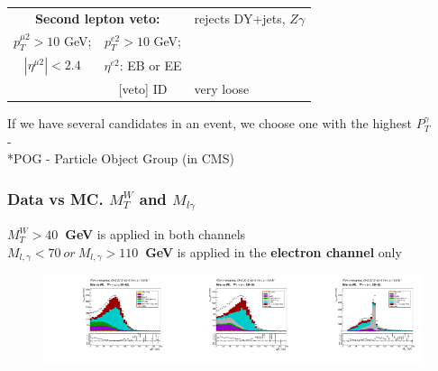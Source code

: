 \begin{frame}
\begin{table}[h]
\begin{center}
\begin{tabular}{|c|c|l|}
      \multicolumn{2}{|c|}{\scriptsize\bfseries{Second lepton veto:}} & rejects DY+jets, $Z\gamma$\\
      \tiny{$p_T^{\mu2}>10$ GeV;} &  \tiny{$p_T^{e2}>10$ GeV;} & \\
      \tiny{$|\eta^{\mu2}|<2.4$}  &   \tiny{ $\eta^{e2}$: EB or EE} &  \\
                                &   \tiny{[veto] ID} & very loose \\ \hline
      \end{tabular}
      \end{center}
  \end{table}
\scriptsize
If we have several candidates in an event, we choose one with the highest $P_T^{\gamma}$\\
-\\
\tiny
*POG - Particle Object Group (in CMS)\\
\end{frame}%

\begin{frame}\frametitle{Data vs MC. $M_T^W$ and $M_{l\gamma}$}
\scriptsize
{\bfseries{$M_T^W>40$~GeV}} is applied in both channels\\
{\bfseries{$M_{l,\gamma}<70~or~M_{l,\gamma}>110$~GeV}} is applied in the {\bfseries{electron channel}} only
\begin{figure}[htb]
  \begin{center}
   \includegraphics[width=0.33\textwidth]{../figs/figs_v11/MUON_WGamma/PrepareYields/c_TotalDATAvsMC_EtaCommon__WMtVERY_PRELIMINARY.pdf}\includegraphics[width=0.33\textwidth]{../figs/figs_v11/ELECTRON_WGamma/PrepareYields/c_TotalDATAvsMC_EtaCommon__WMtVERY_PRELIMINARY.pdf}\includegraphics[width=0.33\textwidth]{../figs/figs_v11/ELECTRON_WGamma/PrepareYields/c_TotalDATAvsMC_EtaCommon__Mpholep1PRELIMINARY_FOR_E_TO_GAMMA_WITH_PSV_CUT.pdf}
  \end{center}
\end{figure}
\end{frame}

